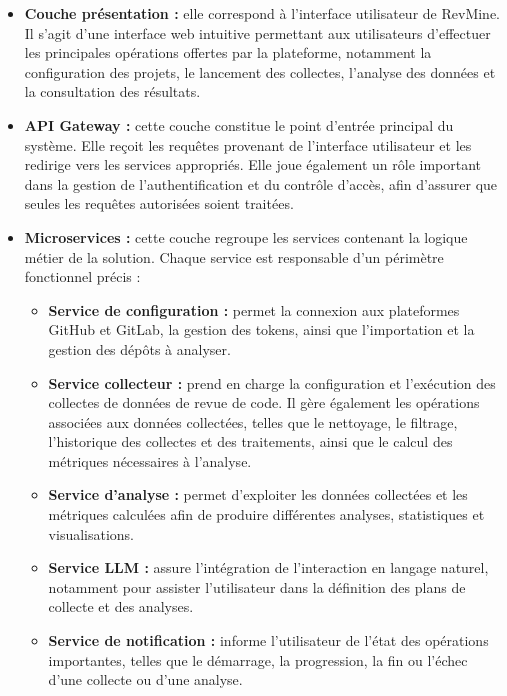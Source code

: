 \begin{itemize}
    \item \textbf{Couche présentation :} elle correspond à l’interface utilisateur de RevMine. Il s’agit d’une interface web intuitive permettant aux utilisateurs d’effectuer les principales opérations offertes par la plateforme, notamment la configuration des projets, le lancement des collectes, l’analyse des données et la consultation des résultats.

    \item \textbf{API Gateway :} cette couche constitue le point d’entrée principal du système. Elle reçoit les requêtes provenant de l’interface utilisateur et les redirige vers les services appropriés. Elle joue également un rôle important dans la gestion de l’authentification et du contrôle d’accès, afin d’assurer que seules les requêtes autorisées soient traitées.

    \item \textbf{Microservices :} cette couche regroupe les services contenant la logique métier de la solution. Chaque service est responsable d’un périmètre fonctionnel précis :
    \begin{itemize}
        \item \textbf{Service de configuration :} permet la connexion aux plateformes GitHub et GitLab, la gestion des tokens, ainsi que l’importation et la gestion des dépôts à analyser.

        \item \textbf{Service collecteur :} prend en charge la configuration et l’exécution des collectes de données de revue de code. Il gère également les opérations associées aux données collectées, telles que le nettoyage, le filtrage, l’historique des collectes et des traitements, ainsi que le calcul des métriques nécessaires à l’analyse.

        \item \textbf{Service d’analyse :} permet d’exploiter les données collectées et les métriques calculées afin de produire différentes analyses, statistiques et visualisations.

        \item \textbf{Service LLM :} assure l’intégration de l’interaction en langage naturel, notamment pour assister l’utilisateur dans la définition des plans de collecte et des analyses.

        \item \textbf{Service de notification :} informe l’utilisateur de l’état des opérations importantes, telles que le démarrage, la progression, la fin ou l’échec d’une collecte ou d’une analyse.


\end{itemize}
\end{itemize}
